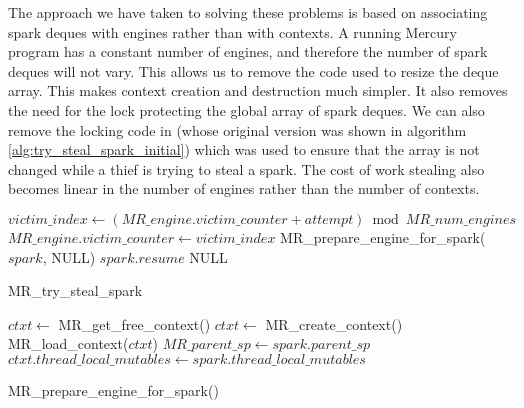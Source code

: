 The approach we have taken to solving these problems is based on associating
spark deques with engines rather than with contexts.
A running Mercury program has a constant number of engines,
and therefore the number of spark deques will not vary.
This allows us to remove the code used to resize the deque array.
This makes context creation and destruction much simpler.
It also removes the need for the lock protecting the global array of spark
deques.
We can also remove the locking code in \trystealspark
(whose original version was shown in algorithm
\ref{alg:try_steal_spark_initial})
which was used to
ensure that the array is not changed while a thief is trying to steal a
spark.
The cost of work stealing also becomes linear in the number of engines
rather than the number of contexts.

\begin{algorithm}[tbp]
\begin{algorithmic}[1]
      \State $victim\_index \gets
          (MR\_engine.victim\_counter + attempt) \bmod MR\_num\_engines$
          \Continue
      \EndIf
        \State $MR\_engine.victim\_counter \gets victim\_index$
        \State MR\_prepare\_engine\_for\_spark($spark$, NULL)
        \State \Return $spark.resume$
      \EndIf
    \EndFor
  \EndIf
  \State \Return NULL
\EndProcedure
\end{algorithmic}
\caption{MR\_try\_steal\_spark}
\label{alg:try_steal_spark_revised}
\end{algorithm}

\begin{algorithm}[tbp]
\begin{algorithmic}
        \State $ctxt \gets$ MR\_get\_free\_context()
            \State $ctxt \gets$ MR\_create\_context()
        \EndIf
        \State MR\_load\_context($ctxt$)
    \EndIf
    \State $MR\_parent\_sp \gets spark.parent\_sp$
    \State $ctxt.thread\_local\_mutables \gets
      spark.thread\_local\_mutables$
\EndProcedure
\end{algorithmic}
\caption{MR\_prepare\_engine\_for\_spark()}
\label{alg:prepare_engine_for_spark}
\end{algorithm}

